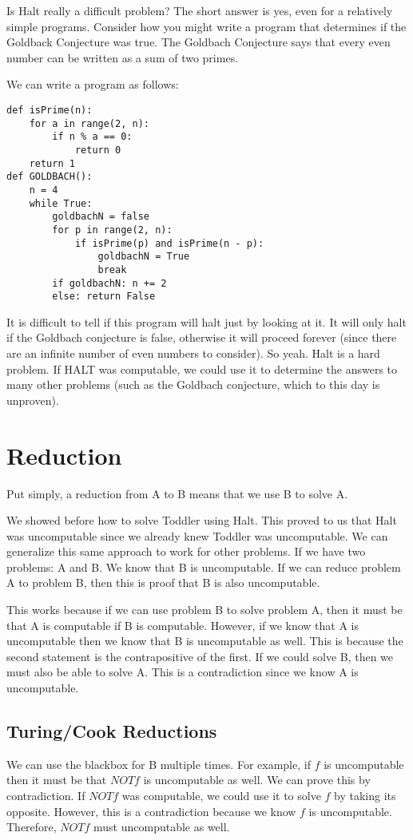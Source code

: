 Is Halt really a difficult problem? The short answer is yes, even for a relatively simple programs. Consider how you might write a program that determines if the Goldback Conjecture was true. The Goldbach Conjecture says that every even number can be written as a sum of two primes.

We can write a program as follows:

\begin{verbatim}
def isPrime(n):
    for a in range(2, n):
        if n % a == 0:
            return 0
    return 1
def GOLDBACH():
    n = 4
    while True:
        goldbachN = false
        for p in range(2, n):
            if isPrime(p) and isPrime(n - p):
                goldbachN = True
                break
        if goldbachN: n += 2
        else: return False
\end{verbatim}

It is difficult to tell if this program will halt just by looking at it. It will only halt if the Goldbach conjecture is false, otherwise it will proceed forever (since there are an infinite number of even numbers to consider). So yeah. Halt is a hard problem. If HALT was computable, we could use it to determine the answers to many other problems (such as the Goldbach conjecture, which to this day is unproven).

\section{Reduction}
Put simply, a reduction from A to B means that we use B to solve A.

We showed before how to solve Toddler using Halt. This proved to us that Halt was uncomputable since we already knew Toddler was uncomputable. We can generalize this same approach to work for other problems. If we have two problems: A and B. We know that B is uncomputable. If we can reduce problem A to problem B, then this is proof that B is also uncomputable.

This works because if we can use problem B to solve problem A, then it must be that A is computable if B is computable. However, if we know that A is uncomputable then we know that B is uncomputable as well. This is because the second statement is the contrapositive of the first. If we could solve B, then we must also be able to solve A. This is a contradiction since we know A is uncomputable.

\subsection*{Turing/Cook Reductions}
We can use the blackbox for B multiple times. For example, if $f$ is uncomputable then it must be that $NOTf$ is uncomputable as well. We can prove this by contradiction. If $NOTf$ was computable, we could use it to solve $f$ by taking its opposite. However, this is a contradiction because we know $f$ is uncomputable. Therefore, $NOTf$ must uncomputable as well.

